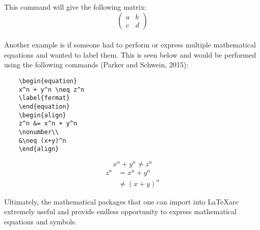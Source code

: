 \documentclass[a4paper, 11pt]{report}
\begin{document}
    \noindent
    This command will give the following matrix:
    \[
    \begin{pmatrix}
    a & b\\
    c & d
    \end{pmatrix}
    \]
    \\
    \noindent
    Another example is if someone had to perform or express multiple mathematical equations and wanted to label them. This is seen below and would be performed using the following commands (Parker and Schwein, 2015):
    
    \begin{verbatim}
    \begin{equation}
    x^n + y^n \neq z^n
    \label{fermat}
    \end{equation}
    \begin{align}
    z^n &= x^n + y^n
    \nonumber\\
    &\neq (x+y)^n
    \end{align}
    \end{verbatim}
    
    \begin{equation}
    x^n + y^n \neq z^n
    \label{fermat}
    \end{equation}
    \begin{align}
    z^n &= x^n + y^n
    \nonumber\\
    &\neq (x+y)^n
    \end{align}

    \noindent
    Ultimately, the mathematical packages that one can import into \LaTeX \space are extremely useful and provide endless opportunity to express mathematical equations and symbols.
    \\
	
\end{document}

